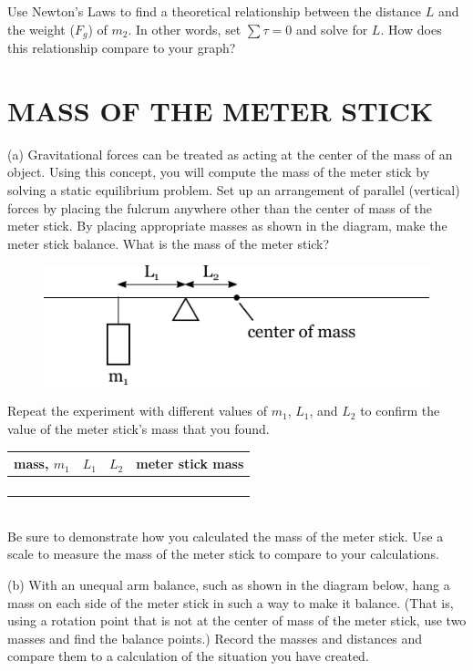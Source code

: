 \documentclass[11pt,letterpaper]{article}
\begin{document}
Use Newton's Laws to find a theoretical relationship between the distance $L$ and the weight ($F_g$) of $m_2$. In other words, set $\sum\tau=0$ and solve for $L$. How does this relationship compare to your graph?


\section{MASS OF THE METER STICK}
(a) Gravitational forces can be treated as acting at the center of the mass of an object. Using this concept, you will compute the mass of the meter stick by solving a static equilibrium problem. Set up an arrangement of parallel (vertical) forces by placing the fulcrum anywhere other than the center of mass of the meter stick. By placing appropriate masses as shown in the diagram, make the meter stick balance.  What is the mass of the meter stick?

\begin{figure}[h]
\begin{center}
\includegraphics{./lab6_part2a.pdf}
\end{center}
\end{figure}

Repeat the experiment with different values of $m_1$, $L_1$, and $L_2$ to confirm the value of the meter stick's mass that you found.
 
\begin{tabularx}{\linewidth}{|Y|Y|Y|Y|}
\hline
mass, $m_1$ & $L_1$ & $L_2$ & meter stick mass \\
\hline &&&\\
\hline &&&\\
\hline &&&\\
\hline &&&\\
\hline
\end{tabularx}\\

Be sure to demonstrate how you calculated the mass of the meter stick. Use a scale to measure the mass of the meter stick to compare to your calculations.

\clearpage
(b) With an unequal arm balance, such as shown in the diagram below, hang
a mass on each side of the meter stick in such a way to make it
balance.  (That is, using a rotation point that is not at the center
of mass of the meter stick, use two masses and find the balance
points.)  Record the masses and distances and compare them to a
calculation of the situation you have created.
\end{document}
